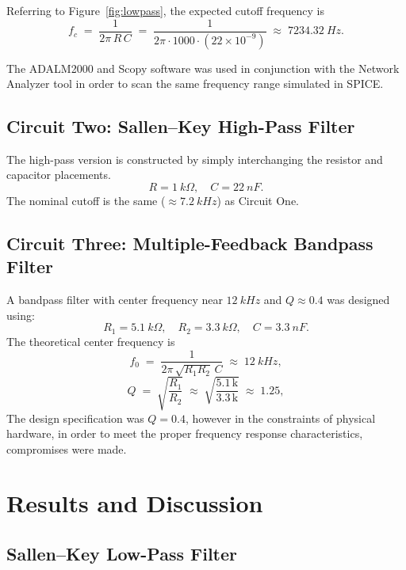\documentclass[12pt]{article}
\begin{document}
Referring to Figure~\ref{fig:lowpass}, the expected cutoff frequency is
\begin{equation*}
f_c \;=\; 
\frac{1}{2\pi\,R\,C}
\;=\; 
\frac{1}{2\pi \cdot 1000 \cdot (22\times10^{-9})}
\;\approx\; 
\SI{7234.32}{Hz}.
\end{equation*}

The ADALM2000 and Scopy software was used in conjunction with the Network
Analyzer tool in order to scan the same frequency range simulated in SPICE.
\subsection{Circuit Two: Sallen--Key High-Pass Filter}
The high-pass version is constructed by simply interchanging the resistor and
capacitor placements.
\[
R = \SI{1}{k\Omega}, \quad C = \SI{22}{nF}.
\]
The nominal cutoff is the same ($\approx\SI{7.2}{kHz}$) as Circuit One.

\subsection{Circuit Three: Multiple-Feedback Bandpass Filter}
A bandpass filter with center frequency near $\SI{12}{kHz}$ and $Q\approx 0.4$
was designed using:
\begin{equation*}
R_1 = \SI{5.1}{k\Omega}, 
\quad
R_2 = \SI{3.3}{k\Omega}, 
\quad
C   = \SI{3.3}{nF}.
\end{equation*}
The theoretical center frequency is
\begin{equation*}
f_0 \;=\; 
\frac{1}{2\pi\,\sqrt{R_1 R_2}\,C}
\;\approx\; 
\SI{12}{kHz},
\end{equation*}
\begin{equation*}
Q 
\;=\;
\sqrt{\frac{R_1}{R_2}}
\;\approx\;
\sqrt{\frac{5.1\,\mathrm{k}}{3.3\,\mathrm{k}}}
\;\approx\;
1.25,
\end{equation*}
The design specification was $Q = 0.4$, however in the constraints of physical
hardware, in order to meet the proper frequency response characteristics,
compromises were made.

\section{Results and Discussion}

\subsection{Sallen--Key Low-Pass Filter}
\end{document}
